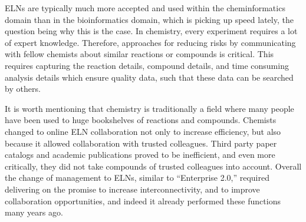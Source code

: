 \documentclass{sig-alternate}
\begin{document}
ELNs are typically much more accepted and used within the cheminformatics
domain than in the bioinformatics domain, which is picking up speed lately, the
question being why this is the case. In chemistry, every experiment requires a lot of expert
knowledge. Therefore, approaches for reducing risks by communicating
with fellow chemists about similar reactions or compounds is critical. This
requires capturing the reaction details, compound details, and time consuming
analysis details which ensure quality data, such that these data can be searched by others.

It is worth mentioning that chemistry is traditionally a field where many people
have been used to huge bookshelves of reactions and compounds. Chemists changed
to online ELN collaboration not only to increase efficiency, but also
because it allowed collaboration with trusted colleagues. Third party paper
catalogs and academic publications proved to be
inefficient, and even more critically, they did not take compounds of trusted
colleagues into account. Overall the change of management to ELNs, similar to
``Enterprise 2.0,'' required delivering on the promise to increase
interconnectivity, and to improve collaboration
opportunities, and indeed it already performed these functions many years ago.
\end{document}
